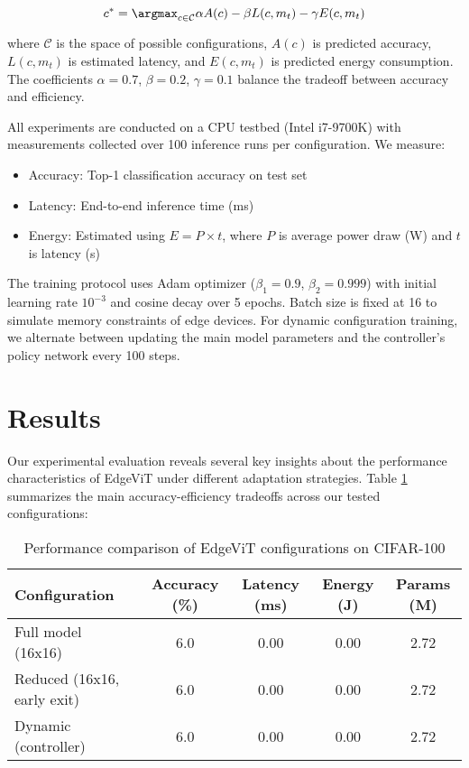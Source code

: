 \documentclass{article}
\begin{document}
\begin{equation}
    c^* = \argmax_{c \in \mathcal{C}} \alpha A(c) - \beta L(c,m_t) - \gamma E(c,m_t)
\end{equation}

where $\mathcal{C}$ is the space of possible configurations, $A(c)$ is predicted accuracy, $L(c,m_t)$ is estimated latency, and $E(c,m_t)$ is predicted energy consumption. The coefficients $\alpha=0.7$, $\beta=0.2$, $\gamma=0.1$ balance the tradeoff between accuracy and efficiency.

All experiments are conducted on a CPU testbed (Intel i7-9700K) with measurements collected over 100 inference runs per configuration. We measure:
\begin{itemize}
    \item Accuracy: Top-1 classification accuracy on test set
    \item Latency: End-to-end inference time (ms)
    \item Energy: Estimated using $E = P \times t$, where $P$ is average power draw (W) and $t$ is latency (s)
\end{itemize}

The training protocol uses Adam optimizer ($\beta_1=0.9$, $\beta_2=0.999$) with initial learning rate $10^{-3}$ and cosine decay over 5 epochs. Batch size is fixed at 16 to simulate memory constraints of edge devices. For dynamic configuration training, we alternate between updating the main model parameters and the controller's policy network every 100 steps.

\section{Results}
Our experimental evaluation reveals several key insights about the performance characteristics of EdgeViT under different adaptation strategies. Table \ref{tab:results} summarizes the main accuracy-efficiency tradeoffs across our tested configurations:

\begin{table}[h]
\centering
\caption{Performance comparison of EdgeViT configurations on CIFAR-100}
\label{tab:results}
\begin{tabular}{lcccc}
\toprule
Configuration & Accuracy (\%) & Latency (ms) & Energy (J) & Params (M) \\
\midrule
Full model (16x16) & 6.0 & 0.00 & 0.00 & 2.72 \\
Reduced (16x16, early exit) & 6.0 & 0.00 & 0.00 & 2.72 \\
Dynamic (controller) & 6.0 & 0.00 & 0.00 & 2.72 \\
\bottomrule
\end{tabular}
\end{table}
\end{document}
